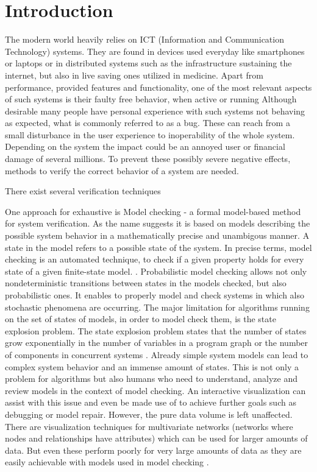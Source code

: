 \documentclass[preview]{standalone}
\begin{document}
\section{Introduction}
	
The modern world heavily relies on ICT (Information and Communication Technology) systems. They are found in devices used everyday like smartphones or laptops or in distributed systems such as the infrastructure sustaining the internet, but also in live saving ones utilized in medicine. Apart from performance, provided features and functionality, one of the most relevant aspects of such systems is their faulty free behavior, when active or running Although desirable many people have personal experience with such systems not behaving as expected, what is commonly referred to as a bug. These can reach from a small disturbance in the user experience to inoperability of the whole system. Depending on the system the impact could be an annoyed user or financial damage of several millions. To prevent these possibly severe negative effects, methods to verify the correct behavior of a system are needed.

There exist several verification techniques 

One approach for exhaustive is Model checking - a formal model-based method for system verification. As the name suggests it is based on models describing the possible system behavior in a mathematically precise and unambigous manner. A state in the model refers to a possible state of the system. In precise terms, model checking is an automated technique, to check if a given property holds for every state of a given finite-state model. \cite[chs. 1.1 and 1.2]{Baier2008}. Probabilistic model checking allows not only nondeterministic transitions between states in the models checked, but also probabilistic ones. It enables to properly model and check systems in which also stochastic phenomena are occurring. The major limitation for algorithms running on the set of states of models, in order to model check them, is the state explosion problem. The state explosion problem states that the number of states grow exponentially in the number of variables in a program graph or the number of components in concurrent systems \cite[ch. 2.3]{Baier2008}. Already simple system models can lead to complex system behavior and an immense amount of states. This is not only a problem for algorithms but also humans who need to understand, analyze and review models in the context of model checking. An interactive visualization can assist with this issue and even be made use of to achieve further goals such as debugging or model repair. However, the pure data volume is left unaffected. There are visualization techniques  for multivariate networks (networks where nodes and relationships have attributes) which can be used for larger amounts of data. But even these perform poorly for very large amounts of data as they are easily achievable with models used in model checking \cite{Kerren2014,Nobre2019}. 
\end{document}
